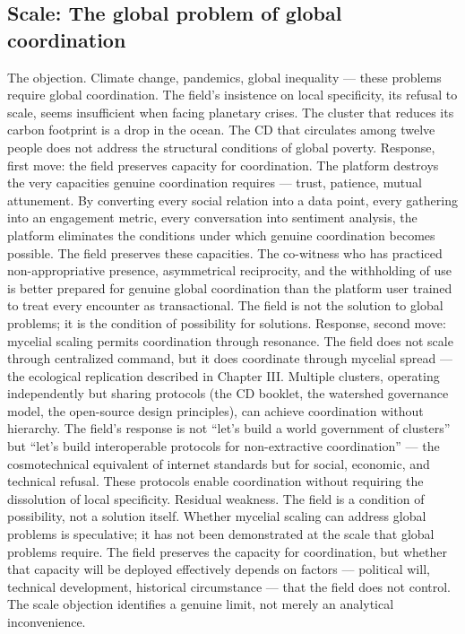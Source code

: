 \subsection{Scale: The global problem of global coordination}

The objection. Climate change, pandemics, global inequality — these problems require global coordination. The field’s insistence on local specificity, its refusal to scale, seems insufficient when facing planetary crises. The cluster that reduces its carbon footprint is a drop in the ocean. The CD that circulates among twelve people does not address the structural conditions of global poverty. Response, first move: the field preserves capacity for coordination. The platform destroys the very capacities genuine coordination requires — trust, patience, mutual attunement. By converting every social relation into a data point, every gathering into an engagement metric, every conversation into sentiment analysis, the platform eliminates the conditions under which genuine coordination becomes possible. The field preserves these capacities. The co-witness who has practiced non-appropriative presence, asymmetrical reciprocity, and the withholding of use is better prepared for genuine global coordination than the platform user trained to treat every encounter as transactional. The field is not the solution to global problems; it is the condition of possibility for solutions. Response, second move: mycelial scaling permits coordination through resonance. The field does not scale through centralized command, but it does coordinate through mycelial spread — the ecological replication described in Chapter III. Multiple clusters, operating independently but sharing protocols (the CD booklet, the watershed governance model, the open-source design principles), can achieve coordination without hierarchy. The field’s response is not “let’s build a world government of clusters” but “let’s build interoperable protocols for non-extractive coordination” — the cosmotechnical equivalent of internet standards but for social, economic, and technical refusal. These protocols enable coordination without requiring the dissolution of local specificity. Residual weakness. The field is a condition of possibility, not a solution itself. Whether mycelial scaling can address global problems is speculative; it has not been demonstrated at the scale that global problems require. The field preserves the capacity for coordination, but whether that capacity will be deployed effectively depends on factors — political will, technical development, historical circumstance — that the field does not control. The scale objection identifies a genuine limit, not merely an analytical inconvenience.

